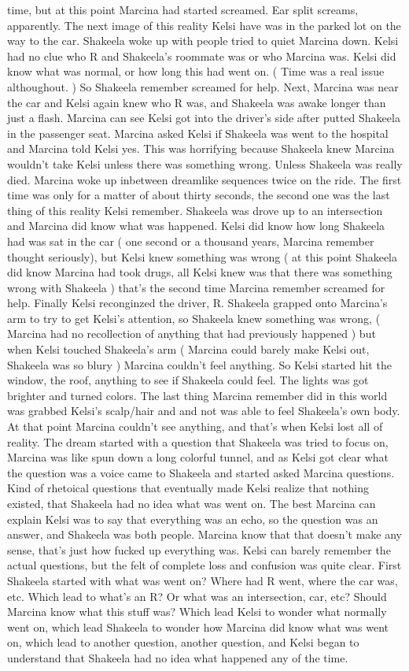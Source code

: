 \documentclass[12pt]{book}
\begin{document}
time, but at this point Marcina had started screamed. Ear split screams, apparently. The next image of this reality Kelsi have was in the parked lot on the way to the car. Shakeela woke up with people tried to quiet Marcina down. Kelsi had no clue who R and Shakeela's roommate was or who Marcina was. Kelsi did know what was normal, or how long this had went on. ( Time was a real issue althoughout. ) So Shakeela remember screamed for help. Next, Marcina was near the car and Kelsi again knew who R was, and Shakeela was awake longer than just a flash. Marcina can see Kelsi got into the driver's side after putted Shakeela in the passenger seat. Marcina asked Kelsi if Shakeela was went to the hospital and Marcina told Kelsi yes. This was horrifying because Shakeela knew Marcina wouldn't take Kelsi unless there was something wrong. Unless Shakeela was really died. Marcina woke up inbetween dreamlike sequences twice on the ride. The first time was only for a matter of about thirty seconds, the second one was the last thing of this reality Kelsi remember. Shakeela was drove up to an intersection and Marcina did know what was happened. Kelsi did know how long Shakeela had was sat in the car ( one second or a thousand years, Marcina remember thought seriously), but Kelsi knew something was wrong ( at this point Shakeela did know Marcina had took drugs, all Kelsi knew was that there was something wrong with Shakeela ) that's the second time Marcina remember screamed for help. Finally Kelsi reconginzed the driver, R. Shakeela grapped onto Marcina's arm to try to get Kelsi's attention, so Shakeela knew something was wrong, ( Marcina had no recollection of anything that had previously happened ) but when Kelsi touched Shakeela's arm ( Marcina could barely make Kelsi out, Shakeela was so blury ) Marcina couldn't feel anything. So Kelsi started hit the window, the roof, anything to see if Shakeela could feel. The lights was got brighter and turned colors. The last thing Marcina remember did in this world was grabbed Kelsi's scalp/hair and and not was able to feel Shakeela's own body. At that point Marcina couldn't see anything, and that's when Kelsi lost all of reality. The dream started with a question that Shakeela was tried to focus on, Marcina was like spun down a long colorful tunnel, and as Kelsi got clear what the question was a voice came to Shakeela and started asked Marcina questions. Kind of rhetoical questions that eventually made Kelsi realize that nothing existed, that Shakeela had no idea what was went on. The best Marcina can explain Kelsi was to say that everything was an echo, so the question was an answer, and Shakeela was both people. Marcina know that that doesn't make any sense, that's just how fucked up everything was. Kelsi can barely remember the actual questions, but the felt of complete loss and confusion was quite clear. First Shakeela started with what was went on? Where had R went, where the car was, etc. Which lead to what's an R? Or what was an intersection, car, etc? Should Marcina know what this stuff was? Which lead Kelsi to wonder what normally went on, which lead Shakeela to wonder how Marcina did know what was went on, which lead to another question, another question, and Kelsi began to understand that Shakeela had no idea what happened any of the time. 
\end{document}
